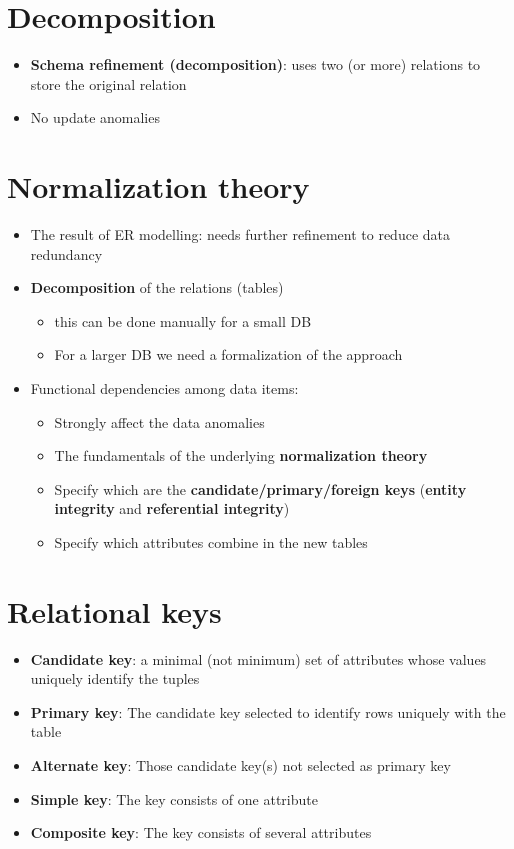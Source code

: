 \documentclass{article}[18pt]
\begin{document}
\section{Decomposition}
\begin{itemize}
	\item \textbf{Schema refinement (decomposition)}: uses two (or more) relations to store the original relation
	\item No update anomalies
\end{itemize}
\section{Normalization theory}
\begin{itemize}
	\item The result of ER modelling: needs further refinement to reduce data redundancy
	\item \textbf{Decomposition} of the relations (tables)
	\begin{itemize}
		\item this can be done manually for a small DB
		\item For a larger DB we need a formalization of the approach
	\end{itemize}
	\item Functional dependencies among data items:
	\begin{itemize}
		\item Strongly affect the data anomalies
		\item The fundamentals of the underlying \textbf{normalization theory}
		\item Specify which are the \textbf{candidate/primary/foreign keys} (\textbf{entity integrity} and \textbf{referential integrity})
		\item Specify which attributes combine in the new tables
	\end{itemize}
\end{itemize}
\section{Relational keys}
\begin{itemize}
	\item \textbf{Candidate key}: a minimal (not minimum) set of attributes whose values uniquely identify the tuples
	\item \textbf{Primary key}: The candidate key selected to identify rows uniquely with the table
	\item \textbf{Alternate key}: Those candidate key(s) not selected as primary key
	\item \textbf{Simple key}: The key consists of one attribute
	\item \textbf{Composite key}: The key consists of several attributes
\end{itemize}
\end{document}
